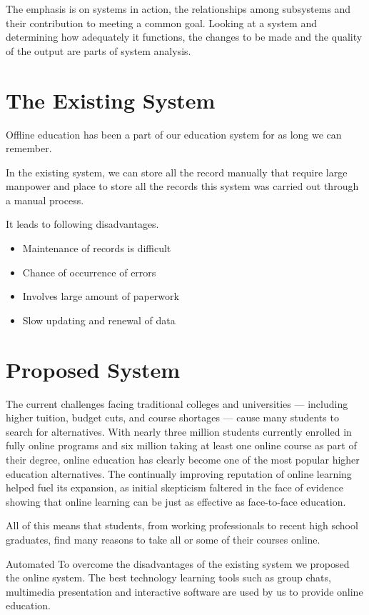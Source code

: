 The emphasis is on systems in action, the relationships among subsystems and their contribution to meeting a common goal. Looking at a system and determining how adequately it functions, the changes to be made and the quality of the output are parts of system analysis. 
%
\section{The Existing System}
Offline education has been a part of our education system for as long we can remember.

In the existing system, we can store all the record manually that require large manpower and place to store all the records
this system was carried out through a manual process.


It leads to following disadvantages.
\begin{itemize}
\item Maintenance of records is difficult
\item Chance of occurrence of errors
\item Involves large amount of paperwork
\item Slow updating and renewal of data 
\end{itemize}	
\section{Proposed System}
The current challenges facing traditional colleges and universities — including higher tuition, budget cuts, and course shortages — cause many students to search for alternatives. With nearly three million students currently enrolled in fully online programs and six million taking at least one online course as part of their degree, online education has clearly become one of the most popular higher education alternatives. The continually improving reputation of online learning helped fuel its expansion, as initial skepticism faltered in the face of evidence showing that online learning can be just as effective as face-to-face education.


All of this means that students, from working professionals to recent high school graduates, find many reasons to take all or some of their courses online.

Automated To overcome the disadvantages of the existing system we proposed the online system.
The best technology learning tools such as  group chats, multimedia presentation and interactive software are used by us to provide online education.

